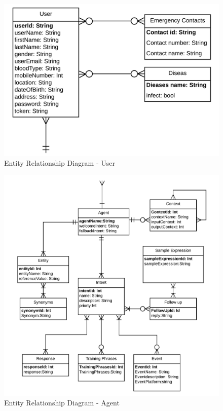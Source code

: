 \documentclass{scrreprt}
\begin{document}
\clearpage
\begin{figure}[ht!]
    \centering
    \includegraphics[angle=0, width=\textwidth]{img2/erd1.pdf}
    \caption{Entity Relationship Diagram - User}
    \label{fig:erd1}
\end{figure}



\clearpage
\begin{figure}[ht!]
    \centering
    \includegraphics[angle=0, width=\textwidth]{img2/erd2.pdf}
    \caption{Entity Relationship Diagram - Agent}
    \label{fig:erd2}
\end{figure}
\end{document}

